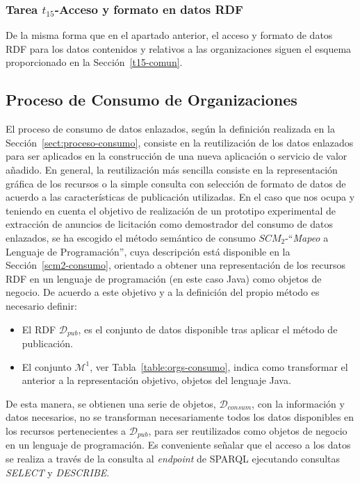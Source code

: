 \subsubsection{Tarea $t_{15}$-Acceso y formato en datos RDF}
De la misma forma que en el apartado anterior, el acceso y formato de datos \gls{RDF} para los datos contenidos y relativos 
a las organizaciones siguen el esquema proporcionado en la Sección~\ref{t15-comun}.

\subsection{Proceso de Consumo de Organizaciones}
El proceso de consumo de datos enlazados, según la definición realizada en la Sección~\ref{sect:proceso-consumo}, consiste en 
la reutilización de los datos enlazados para ser aplicados en la construcción de una nueva aplicación o servicio de valor 
añadido. En general, la reutilización más sencilla consiste en la representación gráfica de los recursos o la simple 
consulta con selección de formato de datos de acuerdo a las características de publicación utilizadas. En el caso 
que nos ocupa y teniendo en cuenta el objetivo de realización de un prototipo experimental de extracción de anuncios 
de licitación como demostrador del consumo de datos enlazados, se ha escogido el método semántico de consumo $SCM_2$-``\textit{Mapeo} a Lenguaje de Programación'', 
cuya descripción está disponible en la Sección~\ref{scm2-consumo}, orientado a obtener una representación de los recursos RDF en un 
lenguaje de programación (en este caso Java) como objetos de negocio. De acuerdo a este objetivo y a la definición del propio método 
es necesario definir:
\begin{itemize}
 \item El \dataset RDF $\mathcal{D}_{pub}$, es el conjunto de datos disponible tras aplicar el método de publicación.
 \item El conjunto $\mathcal{M}^1$, ver Tabla~\ref{table:orgs-consumo}, indica como transformar el \dataset anterior a la representación objetivo, objetos del lenguaje Java.
\end{itemize}

De esta manera, se obtienen una serie de objetos, $\mathcal{D}_{consum}$, con la información y datos necesarios, no se transforman necesariamente todos los datos disponibles en los recursos pertenecientes 
a  $\mathcal{D}_{pub}$, para ser reutilizados como objetos de negocio en un lenguaje de programación. Es conveniente señalar que el acceso a los datos se realiza a través 
de la consulta al \textit{endpoint} de \gls{SPARQL} ejecutando consultas \textit{SELECT} y \textit{DESCRIBE}.


